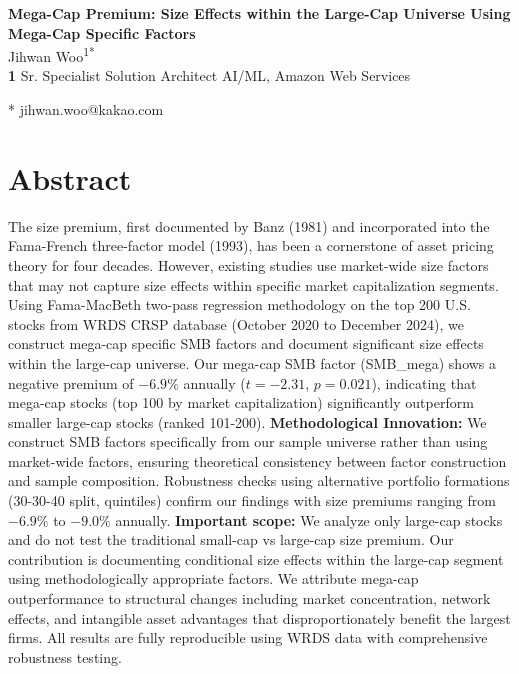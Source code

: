 \documentclass[10pt,letterpaper]{article}
\begin{document}
\vspace*{0.2in}

\begin{flushleft}
{\Large
\textbf{Mega-Cap Premium: Size Effects within the Large-Cap Universe Using Mega-Cap Specific Factors}
}
\newline
\\
Jihwan Woo\textsuperscript{1*}
\\
\bigskip
\textbf{1} Sr. Specialist Solution Architect AI/ML, Amazon Web Services
\\
\bigskip

* jihwan.woo@kakao.com

\end{flushleft}

\section*{Abstract}
The size premium, first documented by Banz (1981) and incorporated into the Fama-French three-factor model (1993), has been a cornerstone of asset pricing theory for four decades. However, existing studies use market-wide size factors that may not capture size effects within specific market capitalization segments. Using Fama-MacBeth two-pass regression methodology on the top 200 U.S. stocks from WRDS CRSP database (October 2020 to December 2024), we construct mega-cap specific SMB factors and document significant size effects within the large-cap universe. Our mega-cap SMB factor (SMB\_mega) shows a negative premium of $-6.9\%$ annually ($t=-2.31$, $p=0.021$), indicating that mega-cap stocks (top 100 by market capitalization) significantly outperform smaller large-cap stocks (ranked 101-200). \textbf{Methodological Innovation:} We construct SMB factors specifically from our sample universe rather than using market-wide factors, ensuring theoretical consistency between factor construction and sample composition. Robustness checks using alternative portfolio formations (30-30-40 split, quintiles) confirm our findings with size premiums ranging from $-6.9\%$ to $-9.0\%$ annually. \textbf{Important scope:} We analyze only large-cap stocks and do not test the traditional small-cap vs large-cap size premium. Our contribution is documenting conditional size effects within the large-cap segment using methodologically appropriate factors. We attribute mega-cap outperformance to structural changes including market concentration, network effects, and intangible asset advantages that disproportionately benefit the largest firms. All results are fully reproducible using WRDS data with comprehensive robustness testing.
\end{document}
